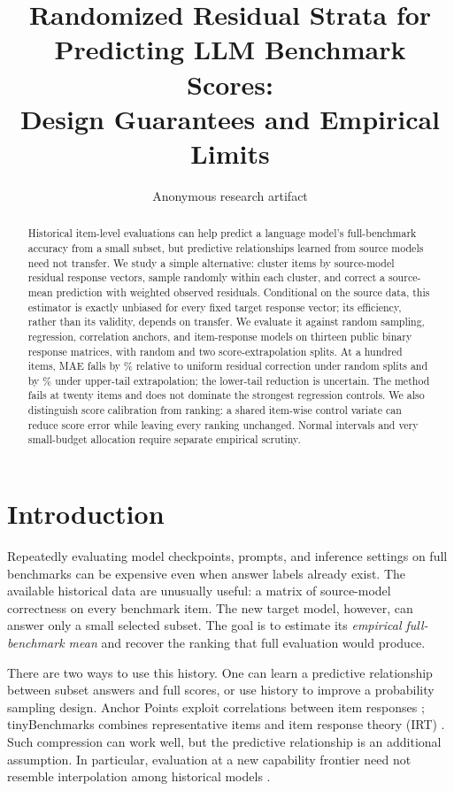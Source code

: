 \documentclass{article}
\title{Randomized Residual Strata for Predicting LLM Benchmark Scores:\\Design Guarantees and Empirical Limits}
\author{Anonymous research artifact}
\begin{document}
\maketitle

\begin{abstract}
Historical item-level evaluations can help predict a language model's full-benchmark accuracy from a small subset, but predictive relationships learned from source models need not transfer. We study a simple alternative: cluster items by source-model residual response vectors, sample randomly within each cluster, and correct a source-mean prediction with weighted observed residuals. Conditional on the source data, this estimator is exactly unbiased for every fixed target response vector; its efficiency, rather than its validity, depends on transfer. We evaluate it against random sampling, regression, correlation anchors, and item-response models on thirteen public binary response matrices, with random and two score-extrapolation splits. At a hundred items, MAE falls by \RandomGain\% relative to uniform residual correction under random splits and by \UpperGain\% under upper-tail extrapolation; the lower-tail reduction is uncertain. The method fails at twenty items and does not dominate the strongest regression controls. We also distinguish score calibration from ranking: a shared item-wise control variate can reduce score error while leaving every ranking unchanged. Normal intervals and very small-budget allocation require separate empirical scrutiny.
\end{abstract}

\section{Introduction}
Repeatedly evaluating model checkpoints, prompts, and inference settings on full benchmarks can be expensive even when answer labels already exist. The available historical data are unusually useful: a matrix of source-model correctness on every benchmark item. The new target model, however, can answer only a small selected subset. The goal is to estimate its \emph{empirical full-benchmark mean} and recover the ranking that full evaluation would produce.

There are two ways to use this history. One can learn a predictive relationship between subset answers and full scores, or use history to improve a probability sampling design. Anchor Points exploit correlations between item responses \citep{vivek2024}; tinyBenchmarks combines representative items and item response theory (IRT) \citep{polo2024}. Such compression can work well, but the predictive relationship is an additional assumption. In particular, evaluation at a new capability frontier need not resemble interpolation among historical models \citep{zhang2025}.
\end{document}
